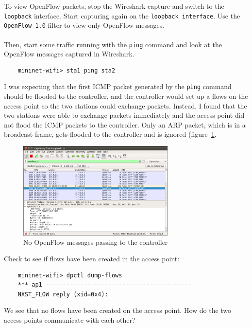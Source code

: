 To view OpenFlow packets, stop the Wireshark capture and switch to the \texttt{loopback} interface. Start capturing again on the \texttt{loopback interface}. Use the \texttt{OpenFlow\_1.0} filter to view only OpenFlow messages.
\\
\\
\noindent Then, start some traffic running with the \texttt{ping} command and look at the OpenFlow messages captured in Wireshark.

\begin{verbatim}
    mininet-wifi> sta1 ping sta2
\end{verbatim}   

I was expecting that the first ICMP packet generated by the \texttt{ping} command should be flooded to the controller, and the controller would set up a flows on the access point so the two stations could exchange packets. Instead, I found that the two stations were able to exchange packets immediately and the access point did not flood the ICMP packets to the controller. Only an ARP packet, which is in a broadcast frame, gets flooded to the controller and is ignored (figure~\ref{fig:ofmsg}. \\

\begin{figure}
    \centering
    \includegraphics[width=0.7\textwidth]{Pictures/mn-wifi-20.png}
    \caption{No OpenFlow messages passing to the controller}
    \label{fig:ofmsg}
\end{figure}

\noindent Check to see if flows have been created in the access point:

\begin{verbatim}
    mininet-wifi> dpctl dump-flows
    *** ap1 ------------------------------------------
    NXST_FLOW reply (xid=0x4):
\end{verbatim}   

We see that no flows have been created on the access point. How do the two access points communicate with each other?

